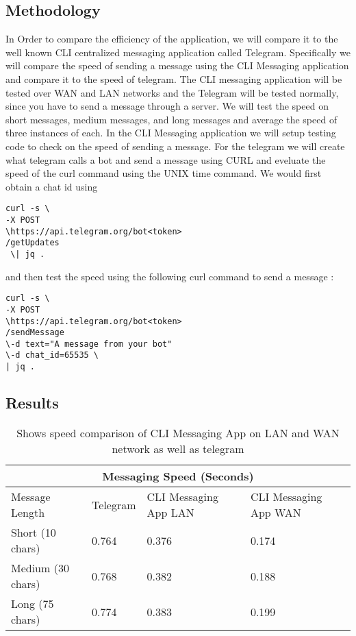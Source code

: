 \documentclass[twoside]{article}
\begin{document}
\begin{multicols}{2}
\subsection{Methodology}
In Order to compare the efficiency of the application, we will compare it to the well known CLI centralized messaging application called Telegram. Specifically we will compare the speed of sending a message using the CLI Messaging application and compare it to the speed of telegram. The CLI messaging application will be tested over WAN and LAN networks and the Telegram will be tested normally, since you have to send a message through a server. We will test the speed on short messages, medium messages, and long messages and average the speed of three instances of each. In the CLI Messaging application we will setup testing code to check on the speed of sending a message. For the telegram we will create what telegram calls a bot and send a message using CURL and eveluate the speed of the curl command using the UNIX time command. We would first obtain a chat id using 
\begin{lstlisting}
curl -s \ 
-X POST 
\https://api.telegram.org/bot<token>
/getUpdates
 \| jq .
\end{lstlisting} 
and then test the speed using the following curl command to send a message \cite{malizia}: 
\begin{lstlisting}
curl -s \
-X POST 
\https://api.telegram.org/bot<token>
/sendMessage 
\-d text="A message from your bot" 
\-d chat_id=65535 \ 
| jq .
\end{lstlisting} 
\centering
\subsection{Results}
\begin{table*}[t]
\centering
\begin{tabular}{ |p{3cm}||p{3cm}|p{3cm}|p{3cm}|  }
 \hline
 \multicolumn{4}{|c|}{Messaging Speed (Seconds)} \\
 \hline
Message Length& Telegram &CLI Messaging App LAN &CLI Messaging App WAN \\
 \hline
 Short (10 chars)   &0.764&0.376& 0.174\\
 Medium (30 chars)&0.768  &0.382& 0.188\\
 Long (75 chars) &0.774 & 0.383&0.199 \\
 \hline
\end{tabular}
\caption{ Shows speed comparison of CLI Messaging App on LAN and WAN network as well as telegram}
\end{table*}
\FloatBarrier


\end{multicols}
\end{document}
